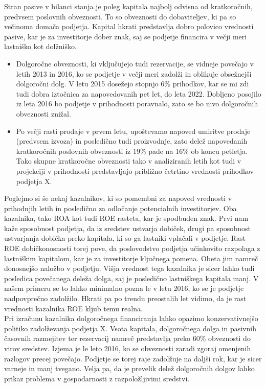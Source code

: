 \documentclass[12pt,a4paper]{amsart}
\theoremstyle{definition} %
\theoremstyle{plain} %
\begin{document}
\begin{itemize}
\begin{itemize}
\end{itemize}
Stran pasive v bilanci stanja je poleg kapitala najbolj odvisna od kratkoročnih, predvsem poslovnih obveznosti. To so obveznosti do dobaviteljev, ki pa so večinoma domača podjetja. Kapital hkrati predstavlja dobro polovico vrednosti pasive, kar je za investitorje dober znak, saj se podjetje financira v večji meri lastniško kot dolžniško.
\begin{itemize}
\item Dolgoročne obveznosti, ki vključujejo tudi rezervacije, se vidneje povečajo v letih 2013 in 2016, ko se podjetje v večji meri zadolži in oblikuje obsežnejši dolgoročni dolg. V letu 2015 dosežejo stopnjo 6\% prihodkov, kar se mi zdi tudi dobra iztočnica za napovedovanih pet let, do leta 2022. Dobljeno posojilo iz leta 2016 bo podjetje v prihodnosti poravnalo, zato se bo nivo dolgoročnih obveznosti znižal.
\item Po večji rasti prodaje v prvem letu, upoštevamo napoved umiritve prodaje (predvsem izvoza) in posledično tudi proizvodnje, zato delež napovedanih kratkoročnih poslovnih obveznosti iz 19\% pade na 16\% ob koncu petletja. Tako skupne kratkoročne obveznosti tako v analiziranih letih kot tudi v projekciji v prihodnosti predstavljajo približno četrtino vrednosti prihodkov podjetja X.
\end{itemize}
Poglejmo si še nekaj kazalnikov, ki so pomembni za napoved vrednosti v prihodnjih letih in posledično za odločanje potencialnih investitorjev. Oba kazalnika, tako ROA kot tudi ROE rasteta, kar je spodbuden znak. Prvi nam kaže sposobnost podjetja, da iz sredstev ustvarja dobiček, drugi pa sposobnost ustvarjanja dobička preko kapitala, ki so ga lastniki vplačali v podjetje. Rast ROE dobičkonosnosti torej pove, da poslovodstvo podjetja učinkovito razpolaga z lastniškim kapitalom, kar je za investitorje ključnega pomena. Obeta jim namreč donosnejšo naložbo v podjetju. Višja vrednost tega kazalnika je sicer lahko tudi posledica povečanega deleža dolga, saj je posledično lastniškega kapitala manj. V našem primeru se to lahko minimalno pozna le v letu 2016, ko se je podjetje nadpovprečno zadolžilo. Hkrati pa po trendu preostalih let vidimo, da je rast vrednosti kazalnika ROE kljub temu realna. \\
Pri izračunu kazalnika dolgoročnega financiranja lahko opazimo konzervativnejšo politiko zadolževanja podjetja X. Vsota kapitala, dolgoročnega dolga in pasivnih časovnih razmejitev ter rezervacij namreč predstavlja preko 60\% obveznosti do virov sredstev. Izjema je le leto 2016, ko se obveznosti zaradi zgoraj omenjenih razlogov precej povečajo. Podjetje se torej raje zadolžuje na daljši rok, kar je sicer varneje in manj tvegano. Velja pa, da je prevelik delež dolgoročnih dolgov lahko prikaz problema v gospodarnosti z razpoložljivimi sredstvi.\\

\end{itemize}
\end{document}
